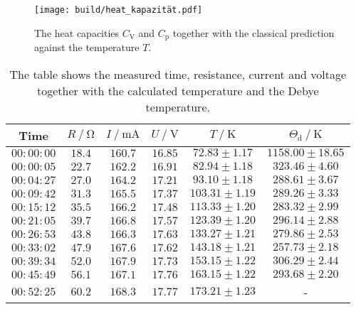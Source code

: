 \begin{figure}[H]
    \centering
    \texttt{[image: build/heat\_kapazität.pdf]}
    \caption{The heat capacities $C_\text{V}$ and $C_\text{p}$ together with the classical prediction against the temperature $T$.}
    \label{fig:heat_cap_plot}
\end{figure}

\begin{table}[H]
    \centering
    \caption{The table shows the measured time, resistance, current and voltage together with the calculated temperature and the Debye temperature.}
    \label{tab:data}
    \begin{tabular}{c c c c c c}
    \toprule
      {Time} & $R \mathbin{/} \unit{\ohm}$ & $I \mathbin{/} \unit{\milli\ampere}$&$U \mathbin{/} \unit{\volt} $& $T \mathbin{/} \unit{\kelvin}$&$\Theta_\text{d} \mathbin{/} \unit{\kelvin}$ \\
    \midrule
          $00:00:00$  &  $18.4$ &    $160.7$ &   $ 16.85$  & $72.83  \pm 1.17$&    $1158.00\pm 18.65$   \\    
          $00:00:05$  &  $22.7$ &    $162.2$ &   $ 16.91$  & $82.94  \pm 1.18$&    $323.46 \pm 4.60$   \\    
          $00:04:27$  &  $27.0$ &    $164.2$ &   $ 17.21$  & $93.10  \pm 1.18$&    $288.61 \pm 3.67$   \\    
          $00:09:42$  &  $31.3$ &    $165.5$ &   $ 17.37$  & $103.31 \pm 1.19$&    $289.26 \pm 3.33$   \\    
          $00:15:12$  &  $35.5$ &    $166.2$ &   $ 17.48$  & $113.33 \pm 1.20$&    $283.32 \pm 2.99$   \\    
          $00:21:05$  &  $39.7$ &    $166.8$ &   $ 17.57$  & $123.39 \pm 1.20$&    $296.14 \pm 2.88$   \\    
          $00:26:53$  &  $43.8$ &    $166.3$ &   $ 17.63$  & $133.27 \pm 1.21$&    $279.86 \pm 2.53$   \\    
          $00:33:02$  &  $47.9$ &    $167.6$ &   $ 17.62$  & $143.18 \pm 1.21$&    $257.73 \pm 2.18$   \\    
          $00:39:34$  &  $52.0$ &    $167.9$ &   $ 17.73$  & $153.15 \pm 1.22$&    $306.29 \pm 2.44$   \\    
          $00:45:49$  &  $56.1$ &    $167.1$ &   $ 17.76$  & $163.15 \pm 1.22$&    $293.68 \pm 2.20$   \\    
          $00:52:25$  &  $60.2$ &    $168.3$ &   $ 17.77$  & $173.21 \pm 1.23$&-                       \\    

\end{tabular}
\end{table}
